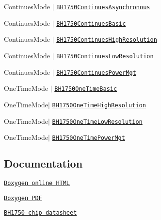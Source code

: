\begin{DoxyItemize}
\item Continues\+Mode $\vert$ \href{https://github.com/Erriez/ErriezBH1750/blob/master/examples/ContinuesMode/BH1750ContinuesAsynchronous/BH1750ContinuesAsynchronous.ino}{\tt B\+H1750\+Continues\+Asynchronous}
\item Continues\+Mode $\vert$ \href{https://github.com/Erriez/ErriezBH1750/blob/master/examples/ContinuesMode/BH1750ContinuesBasic/BH1750ContinuesBasic.ino}{\tt B\+H1750\+Continues\+Basic}
\item Continues\+Mode $\vert$ \href{https://github.com/Erriez/ErriezBH1750/blob/master/examples/ContinuesMode/BH1750ContinuesHighResolution/BH1750ContinuesHighResolution.ino}{\tt B\+H1750\+Continues\+High\+Resolution}
\item Continues\+Mode $\vert$ \href{https://github.com/Erriez/ErriezBH1750/blob/master/examples/ContinuesMode/BH1750ContinuesLowResolution/BH1750ContinuesLowResolution.ino}{\tt B\+H1750\+Continues\+Low\+Resolution}
\item Continues\+Mode $\vert$ \href{https://github.com/Erriez/ErriezBH1750/blob/master/examples/ContinuesMode/BH1750ContinuesPowerMgt/BH1750ContinuesPowerMgt.ino}{\tt B\+H1750\+Continues\+Power\+Mgt}
\item One\+Time\+Mode $\vert$ \href{https://github.com/Erriez/ErriezBH1750/blob/master/examples/OneTimeMode/BH1750OneTimeBasic/BH1750OneTimeBasic.ino}{\tt B\+H1750\+One\+Time\+Basic}
\item One\+Time\+Mode$\vert$ \href{https://github.com/Erriez/ErriezBH1750/blob/master/examples/OneTimeMode/BH1750OneTimeHighResolution/BH1750OneTimeHighResolution.ino}{\tt B\+H1750\+One\+Time\+High\+Resolution}
\item One\+Time\+Mode$\vert$ \href{https://github.com/Erriez/ErriezBH1750/blob/master/examples/OneTimeMode/BH1750OneTimeLowResolution/BH1750OneTimeLowResolution.ino}{\tt B\+H1750\+One\+Time\+Low\+Resolution}
\item One\+Time\+Mode$\vert$ \href{https://github.com/Erriez/ErriezBH1750/blob/master/examples/OneTimeMode/BH1750OneTimePowerMgt/BH1750OneTimePowerMgt.ino}{\tt B\+H1750\+One\+Time\+Power\+Mgt}
\end{DoxyItemize}

\subsection*{Documentation}


\begin{DoxyItemize}
\item \href{https://erriez.github.io/ErriezBH1750}{\tt Doxygen online H\+T\+ML}
\item \href{https://github.com/Erriez/ErriezBH1750/raw/gh-pages/latex/ErriezBH1750.pdf}{\tt Doxygen P\+DF}
\item \href{https://github.com/Erriez/ErriezBH1750/raw/master/extras/BH1750_datasheet.pdf}{\tt B\+H1750 chip datasheet}
\end{DoxyItemize}

